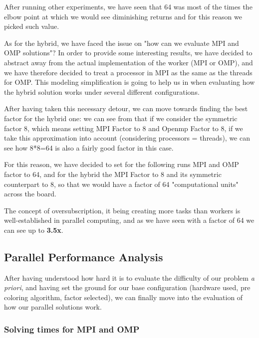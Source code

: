 After running other experiments, we have seen that 64 was most of the times the elbow point at which we would see diminishing returns and for this reason we picked such value.

As for the hybrid, we have faced the issue on "how can we evaluate MPI and OMP solutions"? In order to provide some interesting results, we have decided to abstract away from the actual implementation of the worker (MPI or OMP), and we have therefore decided to treat a processor in MPI as the same as the threads for OMP. This modeling simplification is going to help us in  when evaluating how the hybrid solution works under several different configurations.

After having taken this necessary detour, we can move towards finding the best factor for the hybrid one: we can see from  that if we consider the symmetric factor 8, which means setting MPI Factor to 8 and Openmp Factor to 8, if we take this approximation into account (considering processors = threads), we can see how 8*8=64 is also a fairly good factor in this case.


For this reason, we have decided to set for the following runs MPI and OMP factor to 64, and for the hybrid the MPI Factor to 8 and its symmetric counterpart to 8, so that we would have a factor of 64 "computational units" across the board.


The concept of oversubscription, it being creating more tasks than workers is well-established in parallel computing, and as we have seen with a factor of 64 we can see up to \textbf{3.5x}.

\subsection{Parallel Performance Analysis}
\label{subsec:parallel_performance_analysis}

After having understood how hard it is to evaluate the difficulty of our problem \textit{a priori}, and having set the ground for our base configuration (hardware used, pre coloring algorithm, factor selected), we can finally move into the evaluation of how our parallel solutions work.

\subsubsection{Solving times for MPI and OMP}
\label{subsubsec:solving_times_mpi_omp}


